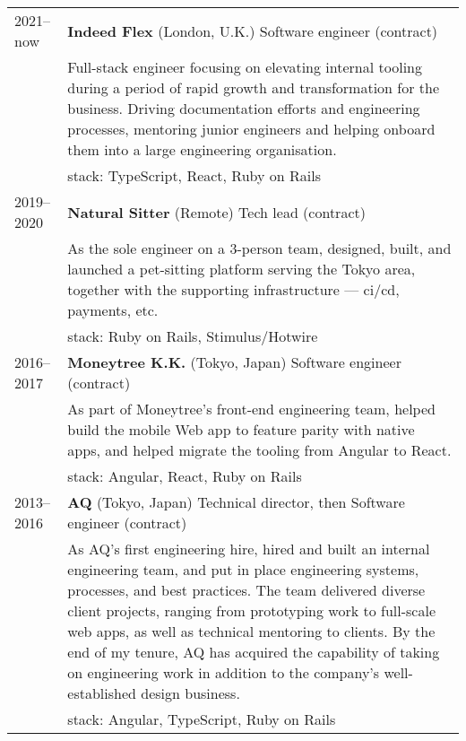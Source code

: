 \documentclass[a4paper,11pt]{article}
\def\companystrut{\rule{0pt}{1.2\normalbaselineskip}}
\def\descriptionstrut{\rule{0pt}{0.9\normalbaselineskip}}
\begin{document}
\begin{tabular}{ p{4.5em} p{41.5em} }
  2021–now & \textbf{Indeed Flex} (London, U.K.) Software engineer (contract)\\
           & \descriptionstrut Full-stack engineer focusing on elevating internal tooling
             during a period of rapid growth and transformation for the business. Driving
             documentation efforts and engineering processes, mentoring junior engineers and
             helping onboard them into a large engineering organisation.\\
           & {\sc stack:} TypeScript, React, Ruby on Rails\\

  2019–2020\companystrut & \textbf{Natural Sitter} (Remote) Tech lead (contract)\\
           & \descriptionstrut As the sole engineer on a 3-person team, designed, built,
             and launched a pet-sitting platform serving the Tokyo area, together with the
             supporting infrastructure — {\sc ci/cd}, payments, etc.\\
           & {\sc stack:} Ruby on Rails, Stimulus/Hotwire\\


  2016–2017\companystrut & \textbf{Moneytree K.K.} (Tokyo, Japan) Software engineer (contract)\\
           & \descriptionstrut As part of Moneytree’s front-end engineering team, helped
             build the mobile Web app to feature parity with native apps, and helped migrate
             the tooling from Angular to React.\\
           & {\sc stack:} Angular, React, Ruby on Rails\\

  2013–2016\companystrut & \textbf{AQ} (Tokyo, Japan) Technical director, {\sc then}
                           Software engineer (contract)\\
           & \descriptionstrut As AQ’s first engineering hire, hired and built an internal
             engineering team, and put in place engineering systems, processes, and best
             practices. The team delivered diverse client projects, ranging from prototyping
             work to full-scale web apps, as well as technical mentoring to clients.
             By the end of my tenure, AQ has acquired the capability of taking on engineering
             work in addition to the company’s well-established design business.\\
           & {\sc stack:} Angular, TypeScript, Ruby on Rails\\


\end{tabular}
\end{document}
